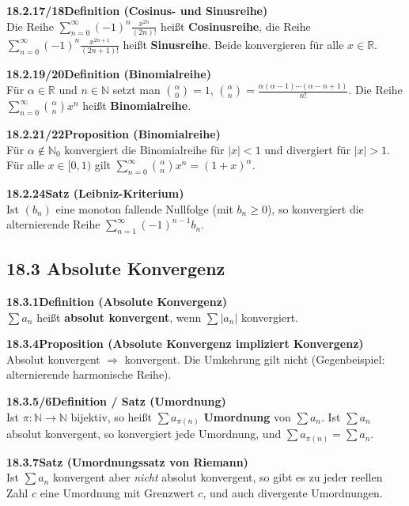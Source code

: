 \documentclass[a4paper,12pt]{article}
\newcommand{\gentry}[3]{%
  \noindent\textbf{#1\quad #2}\nopagebreak\\[0.2em]
  #3\par\smallskip
}
\begin{document}
\gentry{18.2.17/18}{Definition (Cosinus- und Sinusreihe)}{%
  Die Reihe $\displaystyle\sum_{n=0}^{\infty}(-1)^n\frac{x^{2n}}{(2n)!}$ heißt \textbf{Cosinusreihe},
  die Reihe $\displaystyle\sum_{n=0}^{\infty}(-1)^n\frac{x^{2n+1}}{(2n+1)!}$ heißt \textbf{Sinusreihe}.
  Beide konvergieren für alle $x \in \mathbb{R}$.
}

\gentry{18.2.19/20}{Definition (Binomialreihe)}{%
  Für $\alpha \in \mathbb{R}$ und $n \in \mathbb{N}$ setzt man
  $\binom{\alpha}{0}=1$, $\binom{\alpha}{n} = \frac{\alpha(\alpha-1)\cdots(\alpha-n+1)}{n!}$.
  Die Reihe $\displaystyle\sum_{n=0}^{\infty}\binom{\alpha}{n}x^n$ heißt \textbf{Binomialreihe}.
}

\gentry{18.2.21/22}{Proposition (Binomialreihe)}{%
  Für $\alpha \notin \mathbb{N}_0$ konvergiert die Binomialreihe für $|x| < 1$ und
  divergiert für $|x| > 1$. Für alle $x \in [0,1)$ gilt
  $\displaystyle\sum_{n=0}^{\infty}\binom{\alpha}{n}x^n = (1+x)^\alpha$.
}

\gentry{18.2.24}{Satz (Leibniz-Kriterium)}{%
  Ist $(b_n)$ eine monoton fallende Nullfolge (mit $b_n \ge 0$), so konvergiert
  die alternierende Reihe $\displaystyle\sum_{n=1}^{\infty}(-1)^{n-1}b_n$.
}

\subsection*{18.3 \quad Absolute Konvergenz}

\gentry{18.3.1}{Definition (Absolute Konvergenz)}{%
  $\sum a_n$ heißt \textbf{absolut konvergent}, wenn $\sum|a_n|$ konvergiert.
}

\gentry{18.3.4}{Proposition (Absolute Konvergenz impliziert Konvergenz)}{%
  Absolut konvergent $\Rightarrow$ konvergent. Die Umkehrung gilt nicht
  (Gegenbeispiel: alternierende harmonische Reihe).
}

\gentry{18.3.5/6}{Definition / Satz (Umordnung)}{%
  Ist $\pi:\mathbb{N}\to\mathbb{N}$ bijektiv, so heißt $\sum a_{\pi(n)}$
  \textbf{Umordnung} von $\sum a_n$.
  Ist $\sum a_n$ absolut konvergent, so konvergiert jede Umordnung, und
  $\sum a_{\pi(n)} = \sum a_n$.
}

\gentry{18.3.7}{Satz (Umordnungssatz von Riemann)}{%
  Ist $\sum a_n$ konvergent aber \emph{nicht} absolut konvergent, so gibt es
  zu jeder reellen Zahl $c$ eine Umordnung mit Grenzwert $c$, und auch
  divergente Umordnungen.
}

\end{document}
